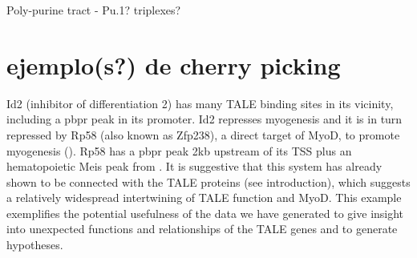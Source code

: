 
Poly-purine tract - Pu.1? triplexes?

\section{ejemplo(s?) de cherry picking}

Id2 (inhibitor of differentiation 2) has many \ac{TALE} binding sites in its vicinity, including a \ac{pbpr} peak in its promoter. Id2 represses myogenesis and it is in turn repressed by Rp58 (also known as Zfp238), a direct target of MyoD, to promote myogenesis (\cite{Yokoyama2009}). Rp58 has a \ac{pbpr} peak 2kb upstream of its TSS plus an hematopoietic Meis peak from \cite{Wilson2010}. It is suggestive that this system has already shown to be connected with the \ac{TALE} proteins (see introduction), which suggests a relatively widespread intertwining of \ac{TALE} function and MyoD. This example exemplifies the potential usefulness of the data we have generated to give insight into unexpected functions and relationships of the \ac{TALE} genes and to generate hypotheses. 

